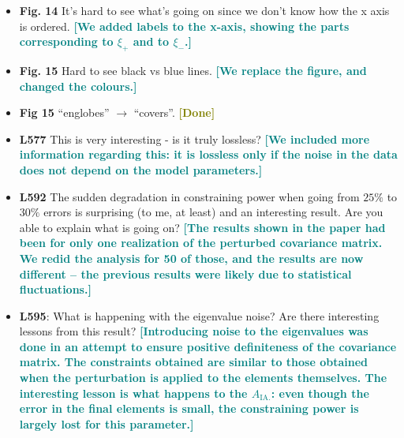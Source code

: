 \documentclass{article}
\newcommand\reply[1]{{\bf {\textcolor{teal}{[#1]}}}}
\newcommand\done{{\bf {\textcolor{olive}{[Done]}}}}
\begin{document}
\begin{itemize}
		\item \textbf{Fig. 14} It’s hard to see what’s going on since we don’t know how the x axis is ordered. \reply{We added labels to the x-axis, showing the parts corresponding to $\xi_+$ and to $\xi_-$.}
		\item \textbf{Fig. 15} Hard to see black vs blue lines. \reply{We replace the figure, and changed the colours.}
		\item \textbf{Fig 15} “englobes” $\rightarrow$ “covers”. \done
		\item \textbf{L577} This is very interesting - is it truly lossless? \reply{We included more information regarding this: it is lossless only if the noise in the data does not depend on the model parameters.}
		\item \textbf{L592} The sudden degradation in constraining power when going from $25\%$ to $30\%$ errors is surprising (to me, at least) and an interesting result. Are you able to explain what is going on? \reply{The results shown in the paper had been for only one realization of the perturbed covariance matrix. We redid the analysis for 50 of those, and the results are now different -- the previous results were likely due to statistical fluctuations.}
		\item \textbf{L595}: What is happening with the eigenvalue noise? Are there interesting lessons from this result? \reply{Introducing noise to the eigenvalues was done in an attempt to ensure positive definiteness of the covariance matrix. The constraints obtained are similar to those obtained when the perturbation is applied to the elements themselves. The interesting lesson is what happens to the $A_{\mathrm{IA}.}$: even though the error in the final elements is small, the constraining power is largely lost for this parameter.}
		
	\end{itemize}
	
\end{document}
